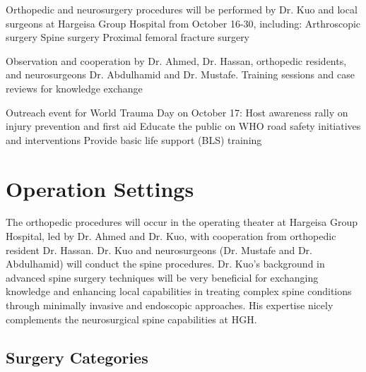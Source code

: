 \documentclass{article}
\begin{document}
\begin{outline}
\1 Orthopedic and neurosurgery procedures will be performed by Dr. Kuo and local surgeons at Hargeisa Group Hospital from October 16-30, including:
\2 Arthroscopic surgery
\2 Spine surgery
\2 Proximal femoral fracture surgery

\1 Observation and cooperation by Dr. Ahmed, Dr. Hassan, orthopedic residents, and neurosurgeons Dr. Abdulhamid and Dr. Mustafe.
\1 Training sessions and case reviews for knowledge exchange

\1 Outreach event for World Trauma Day on October 17:
\2 Host awareness rally on injury prevention and first aid
\2 Educate the public on WHO road safety initiatives and interventions
\2 Provide basic life support (BLS) training

\end{outline}
\clearpage


\section{Operation Settings}
The orthopedic procedures will occur in the operating theater at Hargeisa Group Hospital, led by Dr. Ahmed and Dr. Kuo, with cooperation from orthopedic resident Dr. Hassan.
Dr. Kuo and neurosurgeons (Dr. Mustafe and Dr. Abdulhamid) will conduct the spine procedures. %
Dr. Kuo's background in advanced spine surgery techniques will be very beneficial for exchanging knowledge and enhancing local capabilities in treating complex spine conditions through minimally invasive and endoscopic approaches. His expertise nicely complements the neurosurgical spine capabilities at HGH.

%
\subsection{Surgery Categories}
\end{document}
